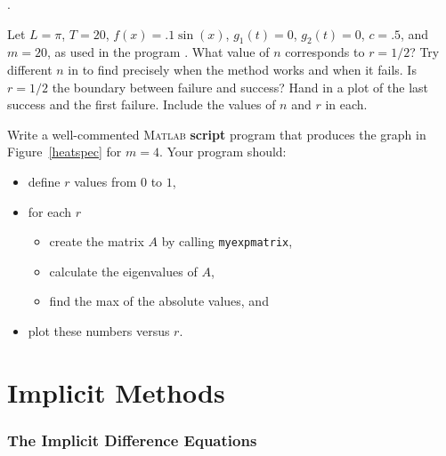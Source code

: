 \begin{list}
{.}{}

\item Let $L=\pi$, $T = 20$, $f(x) = .1\sin(x)$, $g_1(t) = 0$, $g_2(t)
  = 0$, $c = .5$, and $m = 20$, as used in the program
  .  What value of $n$ corresponds to $r =
  1/2$?  Try different $n$ in  to find precisely when
  the method works and when it fails. Is $r = 1/2$ the boundary
  between failure and success?  Hand in a plot of the last success and
  the first failure. Include the values of $n$ and $r$ in each.

\item Write a well-commented \textsc{Matlab} {\bf script}
  program that produces the graph in
  Figure~\ref{heatspec} for $m = 4$. Your program should: 
  \begin{itemize}
  \item define $r$ values from $0$ to $1$,
  \item for each $r$ 
    \begin{itemize}
    \item create the matrix $A$ by calling \verb&myexpmatrix&,
    \item calculate the eigenvalues of $A$,
    \item find the max of the absolute values, and
    \end{itemize}
  \item plot these numbers versus $r$.
  \end{itemize}

\end{list}



\chapter{Implicit Methods}


\subsection*{The Implicit Difference Equations}

